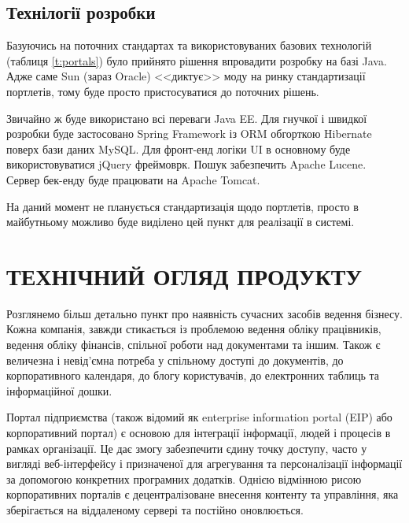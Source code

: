 \subsection{Технілогії розробки} 
Базуючись на поточних стандартах \cite{portlet_2} та використовуваних базових технологій (таблиця \ref{t:portals}) було прийнято рішення впровадити розробку на базі Java.
Адже саме Sun (зараз Oracle) <<диктує>> моду на ринку стандартизації портлетів, тому буде просто пристосуватися до поточних рішень.
\par Звичайно ж буде використано всі переваги Java EE.
Для гнучкої і швидкої розробки буде застосовано Spring Framework із ORM обгорткою Hibernate поверх бази даних MySQL.
Для фронт-енд логіки UI в основному буде використовуватися jQuery фреймоврк.
Пошук забезпечить Apache Lucene.
Сервер бек-енду буде працювати на Apache Tomcat.
\par На даний момент не планується стандартизація щодо портлетів, просто в майбутньому можливо буде виділено цей пункт для реалізації в системі.


\section{ТЕХНІЧНИЙ ОГЛЯД ПРОДУКТУ}
Розглянемо більш детально пункт про наявність сучасних засобів ведення бізнесу. 
Кожна компанія, завжди стикається із проблемою ведення обліку працівників, ведення обліку фінансів, спільної роботи над документами та іншим.
Також є величезна і невід'ємна потреба у спільному доступі до документів, до корпоративного календаря, до блогу користувачів, до електронних таблиць та інформаційної дошки.
\par Портал підприємства (також відомий як enterprise information portal (EIP) або корпоративний портал) є основою для інтеграції інформації, людей і процесів в рамках організації. 
Це дає змогу забезпечити єдину точку доступу, часто у вигляді веб-інтерфейсу і призначеної для агрегування та персоналізації інформації за допомогою конкретних програмних додатків. Однією відмінною рисою корпоративних порталів є децентралізоване внесення контенту та управління, яка зберігається на віддаленому сервері та постійно оновлюється.
